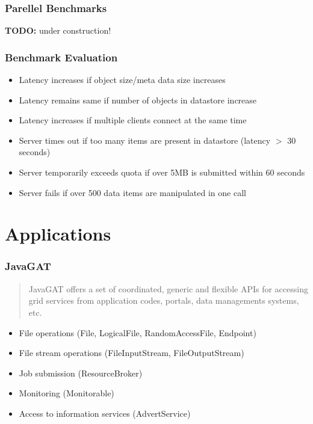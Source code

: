 \documentclass{beamer}
\begin{document}
\frame
{
	\frametitle{Parellel Benchmarks}
	\textbf{TODO:} under construction!
}

\frame
{
	\frametitle{Benchmark Evaluation}
	\begin{itemize}
    	\item Latency increases if object size/meta data size increases
    	\item Latency remains same if number of objects in datastore increase
    	\item Latency increases if multiple clients connect at the same time
    	\item Server times out if too many items are present in datastore (latency
    		$>$ 30 seconds)
    	\item Server temporarily exceeds quota if over 5MB is submitted within
    		60 seconds
    	\item Server fails if over 500 data items are manipulated in one call
    \end{itemize}
}

\section{Applications}
\frame
{
	\frametitle{JavaGAT}
	\begin{quote}
		JavaGAT offers a set of coordinated, generic and flexible APIs for accessing
		grid services from application codes, portals, data managements systems, etc.
	\end{quote}
	
	\begin{itemize}
		\item File operations (File, LogicalFile, RandomAccessFile, Endpoint)
		\item File stream operations (FileInputStream, FileOutputStream)
		\item Job submission (ResourceBroker)
		\item Monitoring (Monitorable)
		\item Access to information services (AdvertService)
	\end{itemize}
}
\end{document}
